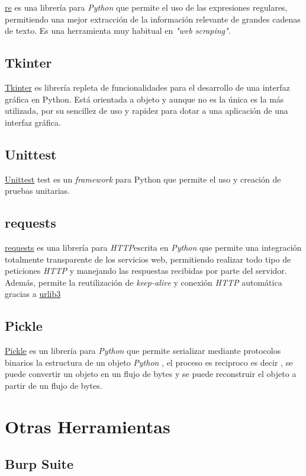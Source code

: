 \href{https://docs.python.org/3/library/re.html}{re} es una librería para \emph{Python} que permite el uso de las expresiones regulares, permitiendo una mejor extracción de la información relevante de grandes cadenas de texto. Es una herramienta muy habitual en \emph{"web scraping"}\cite{re}.
\subsection{Tkinter}
\href {https://wiki.python.org/moin/TkInter}{Tkinter} es librería repleta de funcionalidades para el desarrollo de una interfaz gráfica en Python. Está orientada a objeto y aunque no es la única es la más utilizada, por su sencillez de uso y rapidez para dotar a una aplicación de una interfaz gráfica\cite{tkinter}.
\subsection{Unittest}
\href{https://docs.python.org/3/library/unittest.html}{Unittest} test es un \emph{framework} para Python que permite el uso y creación de pruebas unitarias\cite{unittest}.
\subsection{requests} 
\href{http://docs.python-requests.org/es/latest/}{requests}\cite{requests} es una librería para \emph{HTTP}escrita en \emph{Python} que permite una integración totalmente transparente de los servicios web, permitiendo realizar todo tipo de peticiones \emph{HTTP} y manejando las respuestas recibidas por parte del servidor. Además, permite la reutilización de \emph{keep-alive} y conexión \emph{HTTP}  automática gracias a \href{ https://github.com/urllib3/urllib3}{urlib3} 
\subsection{Pickle}\label{pickle}
\href{https://docs.python.org/3/library/pickle.html}{Pickle} es un librería para \emph{Python} que permite serializar mediante protocolos binarios la estructura de un objeto \emph{Python} , el proceso es reciproco es decir , se puede convertir un objeto en un flujo de bytes y se puede reconstruir el objeto a partir de un flujo de bytes\cite{pickle}. 
\section{Otras Herramientas}

\subsection{Burp Suite}\label{Burp}

